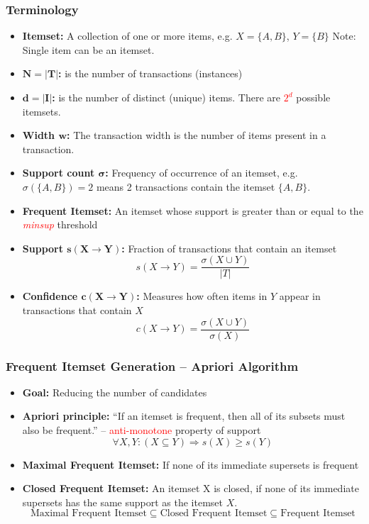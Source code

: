 \documentclass[aspectratio=169, 10pt]{beamer}
\begin{document}
\begin{frame}[t]
\frametitle{Terminology}
\small

\begin{itemize}
    \item \textbf{Itemset:} A collection of one or more items, e.g. $X = \{A, B\}$, $Y =\{ B \}$ Note: Single item can be an itemset.
    \item \textbf{$\bm{N = |T|}$:} is the number of transactions (instances)
    \item \textbf{$\bm{d = |I|}$:} is the number of distinct (unique) items. There are \textcolor{red}{$2^d$} possible itemsets.
    \item \textbf{Width $\bm{w}$:} The transaction width is the number of items present in a transaction.
    \item \textbf{Support count $\bm{\sigma}$:} Frequency of occurrence of an itemset, e.g. $\sigma(\{A, B\})=2$ means 2 transactions contain the itemset $\{A, B\}$.
    \item \textbf{Frequent Itemset:} An itemset whose support is greater than or equal to the \textcolor{red}{\textit{minsup}} threshold
    \item \textbf{Support $\bm{s(X \to Y)}$:} Fraction of transactions that contain an itemset
        \[ s(X \to Y) = \frac{\sigma(X \cup Y)}{|T|} \] 
    \item \textbf{Confidence $\bm{c(X \to Y)}$:} Measures how often items in $Y$ appear in transactions that contain $X$
        \[ c(X \to Y) = \frac{\sigma(X \cup Y)}{\sigma(X)} \] 
\end{itemize}


\end{frame}

\begin{frame}[t]
\frametitle{Frequent Itemset Generation -- Apriori Algorithm}

\begin{itemize}
    \item \textbf{Goal:} Reducing the number of candidates
    \item \textbf{Apriori principle:} ``If an itemset is frequent, then all of its subsets must also be frequent.'' -- \textcolor{red}{anti-monotone} property of support
        \[ \forall X, Y:(X \subseteq Y) \Rightarrow s(X) \geq s(Y) \]
    \item \textbf{Maximal Frequent Itemset:} If none of its immediate supersets is frequent
    \item \textbf{Closed Frequent Itemset:} An itemset X is closed, if none of its immediate supersets has the same support as the itemset $X$.
        \[ \text{Maximal Frequent Itemset} \subseteq \text{Closed Frequent Itemset} \subseteq \text{Frequent Itemset} \]
\end{itemize}

\end{frame}
\end{document}
